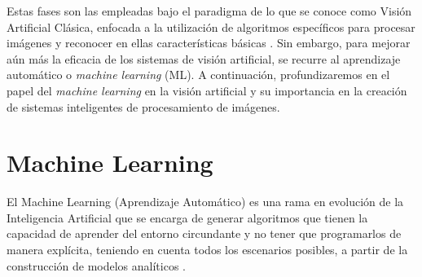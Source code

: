 Estas fases son las empleadas bajo el paradigma de lo que se conoce como Visión
Artificial Clásica, enfocada a la utilización de algoritmos específicos para procesar imágenes y reconocer en ellas características básicas \cite{Martinez22}.%
Sin embargo, para mejorar aún más la eficacia de los sistemas de visión artificial, se recurre al aprendizaje automático o \textit{machine learning} (ML). A continuación, profundizaremos en el papel del \textit{machine learning} en la visión artificial y su importancia en la creación de sistemas inteligentes de procesamiento de imágenes. 

\section{Machine Learning}
\label{sec:MachineLearning} 

El Machine Learning (Aprendizaje Automático) es una rama en evolución de la Inteligencia Artificial que se encarga de generar algoritmos que tienen la capacidad de aprender del entorno circundante y no tener que programarlos de manera explícita, teniendo en cuenta todos los escenarios posibles, a partir de la construcción de modelos analíticos \cite{Sandoval18}.\\ %



 
